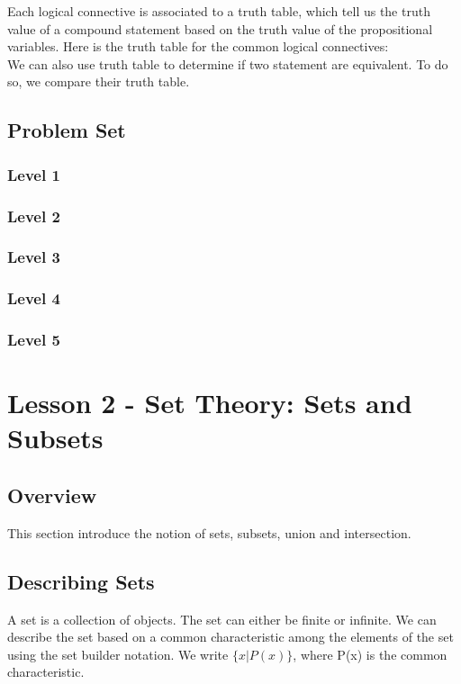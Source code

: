 \documentclass{article}
\begin{document}
\par
Each logical connective is associated to a truth table, which tell us the
truth value of a compound statement based on the truth value of the propositional
variables. Here is the truth table for the common logical connectives:\\

We can also use truth table to determine if two statement are equivalent. To do
so, we compare their truth table.

\subsection{Problem Set}
\subsubsection{Level 1}
\subsubsection{Level 2}
\subsubsection{Level 3}
\subsubsection{Level 4}
\subsubsection{Level 5}
\pagebreak

\section{Lesson 2 - Set Theory: Sets and Subsets}

\subsection{Overview}

This section introduce the notion of sets, subsets, union and intersection.


\subsection{Describing Sets}


\begin{definition}[Set]
A set is a collection of objects. The set can either be finite or infinite. We
can describe the set based on a common characteristic among the elements of the
set using the set builder notation. We write \(\{x|P(x)\}\), where P(x) is the common
characteristic.
\end{definition}
\end{document}
